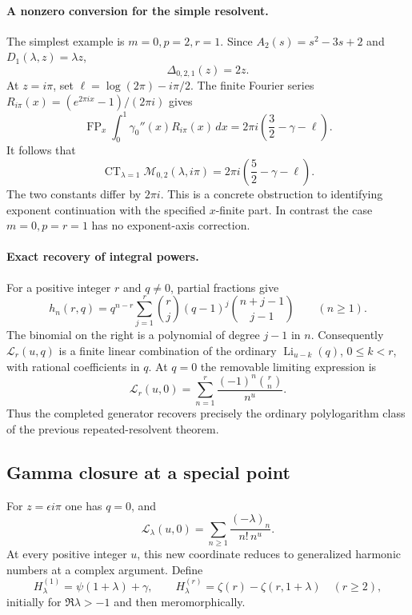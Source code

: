 \paragraph{A nonzero conversion for the simple resolvent.}
The simplest example is \(m=0,p=2,r=1\).  Since
\(A_2(s)=s^2-3s+2\) and \(D_1(\lambda,z)=\lambda z\),
\[
 \Delta_{0,2,1}(z)=2z.
\]
At \(z=i\pi\), set \(\ell=\log(2\pi)-i\pi/2\).
The finite Fourier series
\(R_{i\pi}(x)=(e^{2\pi ix}-1)/(2\pi i)\) gives
\[
 \operatorname{FP}_x\int_0^1\gamma_0''(x)R_{i\pi}(x)\,dx
       =2\pi i\left(\frac32-\gamma-\ell\right).
\]
It follows that
\begin{equation}\label{bhr:cxp:eq:noncommute}
 \operatorname{CT}_{\lambda=1}
       \mathcal M_{0,2}(\lambda,i\pi)
       =2\pi i\left(\frac52-\gamma-\ell\right).
\end{equation}
The two constants differ by \(2\pi i\).  This is a concrete
obstruction to identifying exponent continuation with the
specified \(x\)-finite part.  In contrast the case
\(m=0,p=r=1\) has no exponent-axis correction.

\paragraph{Exact recovery of integral powers.}
For a positive integer \(r\) and \(q\ne0\), partial fractions give
\[
 h_n(r,q)=q^{n-r}
   \sum_{j=1}^r\binom rj(q-1)^j
                    \binom{n+j-1}{j-1}\qquad(n\ge1).
\]
The binomial on the right is a polynomial of degree \(j-1\) in
\(n\).  Consequently \(\mathcal L_r(u,q)\) is a finite linear
combination of the ordinary \(\operatorname{Li}_{u-k}(q)\),
\(0\le k<r\), with rational coefficients in \(q\).
At \(q=0\) the removable limiting expression is
\[
 \mathcal L_r(u,0)
       =\sum_{n=1}^r\frac{(-1)^n\binom rn}{n^u}.
\]
Thus the completed generator recovers precisely the ordinary
polylogarithm class of the previous repeated-resolvent theorem.

\subsection{Gamma closure at a special point}

For \(z=\epsilon i\pi\) one has \(q=0\), and
\[
 \mathcal L_\lambda(u,0)
       =\sum_{n\ge1}\frac{(-\lambda)_n}{n!\,n^u}.
\]
At every positive integer \(u\), this new coordinate reduces to
generalized harmonic numbers at a complex argument.  Define
\[
 H_\lambda^{(1)}=\psi(1+\lambda)+\gamma,\qquad
 H_\lambda^{(r)}=\zeta(r)-\zeta(r,1+\lambda)\quad(r\ge2),
\]
initially for \(\Re\lambda>-1\) and then meromorphically.

